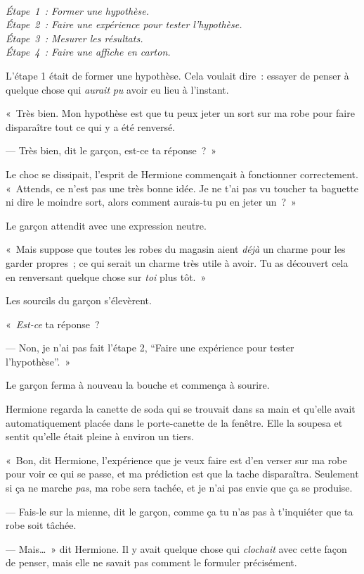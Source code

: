 \emph{\\
Étape~1~: Former une hypothèse.\\
Étape~2~: Faire une expérience pour tester l'hypothèse.\\
Étape~3~: Mesurer les résultats.\\
Étape~4~: Faire une affiche en carton.\\
}

L'étape 1 était de former une hypothèse. Cela voulait dire~: essayer de penser à quelque chose qui \emph{aurait} \emph{pu} avoir eu lieu à l'instant.

«~Très bien. Mon hypothèse est que tu peux jeter un sort sur ma robe pour faire disparaître tout ce qui y a été renversé.

--- Très bien, dit le garçon, est-ce ta réponse~?~»

Le choc se dissipait, l'esprit de Hermione commençait à fonctionner correctement. «~Attends, ce n'est pas une très bonne idée. Je ne t'ai pas vu toucher ta baguette ni dire le moindre sort, alors comment aurais-tu pu en jeter un~?~»

Le garçon attendit avec une expression neutre.

«~Mais suppose que toutes les robes du magasin aient \emph{déjà} un charme pour les garder propres~; ce qui serait un charme très utile à avoir. Tu as découvert cela en renversant quelque chose sur \emph{toi} plus tôt.~»

Les sourcils du garçon s'élevèrent.

«~\emph{Est-ce} ta réponse~?

--- Non, je n'ai pas fait l'étape 2, “Faire une expérience pour tester l'hypothèse”.~»

Le garçon ferma à nouveau la bouche et commença à sourire.

Hermione regarda la canette de soda qui se trouvait dans sa main et qu'elle avait automatiquement placée dans le porte-canette de la fenêtre. Elle la soupesa et sentit qu'elle était pleine à environ un tiers.

«~Bon, dit Hermione, l'expérience que je veux faire est d'en verser sur ma robe pour voir ce qui se passe, et ma prédiction est que la tache disparaîtra. Seulement si ça ne marche \emph{pas}, ma robe sera tachée, et je n'ai pas envie que ça se produise.

--- Fais-le sur la mienne, dit le garçon, comme ça tu n'as pas à t'inquiéter que ta robe soit tâchée.

--- Mais…~» dit Hermione. Il y avait quelque chose qui \emph{clochait} avec cette façon de penser, mais elle ne savait pas comment le formuler précisément.

